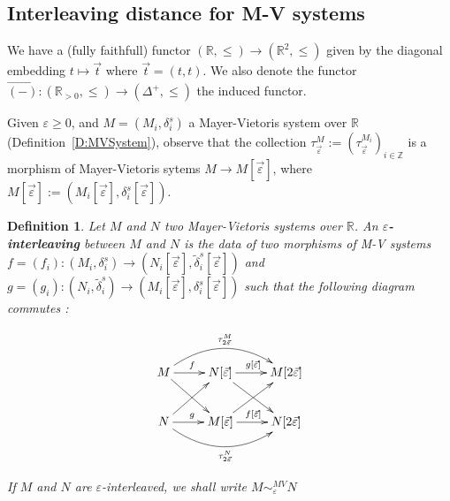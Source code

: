\documentclass[a4paper, english, 11pt]{article}
\newcommand{\0}{\vec{0}}
\newcommand{\R}[0]{\mathbb{R}}
\newcommand{\Z}[0]{\mathbb{Z}}
\newtheorem{defi}[prop]{Definition}
\begin{document}

\subsection{Interleaving distance for M-V systems}
We have a (fully faithfull) functor $(\R ,\leq) \to (\R^2, \leq)$ given by the diagonal embedding  $t\mapsto \vec{t}$ where $\vec{t}=(t,t)$. We also denote  the functor $\vec{(-)}: (\R_{>0} ,\leq) \to (\Delta^+, \leq)$  the induced functor. 

\smallskip

Given $\varepsilon \geq 0$, and $M = (M_i,\delta_i^s)$ a Mayer-Vietoris system over $\R$ (Definition~\ref{D:MVSystem}), observe that the collection $\tau_{\vec{\varepsilon}}^M:=(\tau_{\vec{\varepsilon}}^{M_i})_{i\in\Z}$ is a morphism of Mayer-Vietoris sytems $M \longrightarrow M[\vec{\varepsilon}]$, where $M[\vec{\varepsilon}]:=(M_i[\vec{\varepsilon}],\delta_i^s[\vec{\varepsilon}])$.

\begin{defi}
Let $M$ and $N$ two Mayer-Vietoris systems over $\R$. An \textbf{$\varepsilon$-interleaving} between $M$ and $N$ is the data of two morphisms of M-V systems $f = (f_i) : (M_i,\delta_i^s) \longrightarrow (N_i[\vec{\varepsilon}],\tilde{\delta}_i^s [\vec{\varepsilon}])$ and $g = (g_i) : (N_i,\tilde{\delta}_i^s) \longrightarrow (M_i[\vec{\varepsilon}],\delta_i^s[\vec{\varepsilon}]) $ such that the following diagram commutes : 

\begin{equation}\label{eq:Interleaving} \xymatrix{
M  \ar[rd]\ar@/^0.7cm/[rr]^{\tau_{2\vec{\varepsilon}}^M} \ar[r]^{f} & N[\vec{\varepsilon}]  \ar[rd] \ar[r]^{g[\vec{\varepsilon}]} & M[2\vec{\varepsilon}] \\
N  \ar[ur]\ar@/_0.7cm/[rr]_{\tau_{2\vec{\varepsilon}}^N} \ar[r]^{g} & M[\vec{\varepsilon}]  \ar[ur] \ar[r]^{f[\vec{\varepsilon}]} & N[2\vec{\varepsilon}]
   } \end{equation}
   
If $M$ and $N$ are $\varepsilon$-interleaved, we shall write $M\sim_\varepsilon^{MV} N$

\end{defi}
\end{document}

